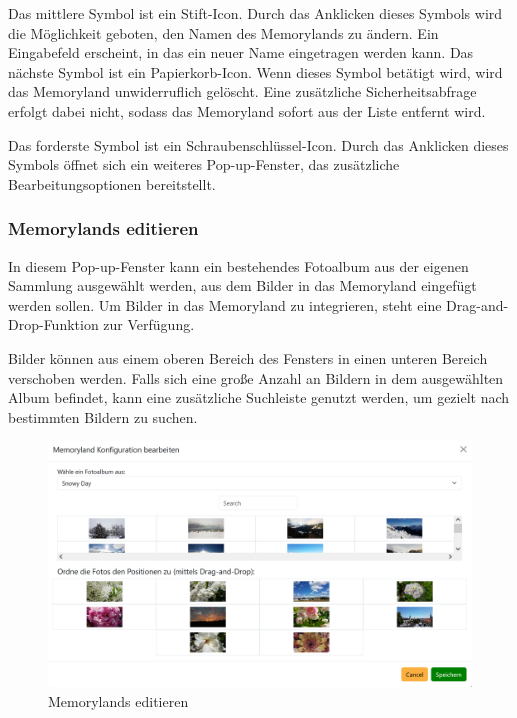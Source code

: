 Das mittlere Symbol ist ein Stift-Icon. Durch das Anklicken dieses Symbols wird 
die Möglichkeit geboten, den Namen des Memorylands zu ändern. Ein Eingabefeld 
erscheint, in das ein neuer Name eingetragen werden kann. Das nächste Symbol ist 
ein Papierkorb-Icon. Wenn dieses Symbol betätigt wird, wird das Memoryland 
unwiderruflich gelöscht. Eine zusätzliche Sicherheitsabfrage erfolgt dabei 
nicht, sodass das Memoryland sofort aus der Liste entfernt wird. 

Das forderste Symbol ist ein Schraubenschlüssel-Icon. Durch das Anklicken dieses 
Symbols öffnet sich ein weiteres Pop-up-Fenster, das zusätzliche Bearbeitungsoptionen 
bereitstellt. 

\subsubsection{Memorylands editieren}

In diesem Pop-up-Fenster kann ein bestehendes Fotoalbum aus der eigenen Sammlung 
ausgewählt werden, aus dem Bilder in das Memoryland eingefügt werden sollen. Um 
Bilder in das Memoryland zu integrieren, steht eine Drag-and-Drop-Funktion zur 
Verfügung. 

Bilder können aus einem oberen Bereich des Fensters in einen unteren 
Bereich verschoben werden. Falls sich eine gro\ss{}e Anzahl an Bildern in dem 
ausgewählten Album befindet, kann eine zusätzliche Suchleiste genutzt werden, 
um gezielt nach bestimmten Bildern zu suchen.

\begin{figure} [h t]
    \centering
    \includegraphics[scale=0.6]{pics/all_worlds_teil2_button.PNG}
    \caption{Memorylands editieren}
    \label{fig:all-worlds-memorylands-editieren}
\end{figure}

